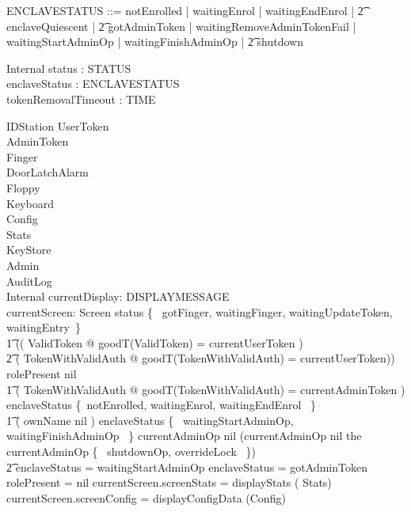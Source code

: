 \begin{zed}
        ENCLAVESTATUS ::= notEnrolled | waitingEnrol | waitingEndEnrol |
\also \t2          enclaveQuiescent |
\also \t2          gotAdminToken | waitingRemoveAdminTokenFail |
waitingStartAdminOp | waitingFinishAdminOp |
\also \t2          shutdown 
\end{zed}

\begin{schema}{Internal}
        status : STATUS
\\      enclaveStatus : ENCLAVESTATUS
\\      tokenRemovalTimeout : TIME
\end{schema}

\begin{schema}{IDStation}
	UserToken
\\	AdminToken
\\	Finger
\\	DoorLatchAlarm
\\      Floppy
\\      Keyboard
\\      Config
\\      Stats
\\      KeyStore
\\      Admin
\\      AuditLog
\\      Internal
\also
	currentDisplay: DISPLAYMESSAGE
\\      currentScreen: Screen
\where
	status \in \{~ gotFinger, waitingFinger, waitingUpdateToken, waitingEntry~\} \implies
\\ \t1		 (( \exists ValidToken @ 
			goodT(\theta ValidToken) = currentUserToken )
\\ \t2  \lor ( \exists TokenWithValidAuth @ 
			goodT(\theta TokenWithValidAuth) = currentUserToken))
\also
        rolePresent \neq nil \implies       
\\ \t1		 ( \exists TokenWithValidAuth @ 
			goodT(\theta TokenWithValidAuth) = currentAdminToken )
\also
        enclaveStatus \notin \{~notEnrolled, waitingEnrol, waitingEndEnrol ~\} \implies       
\\ \t1          ( ownName \neq nil )
\also
        enclaveStatus \in \{~ waitingStartAdminOp, waitingFinishAdminOp ~\} \iff currentAdminOp \neq nil
\also
       (currentAdminOp \neq nil \land the~ currentAdminOp \in \{~
shutdownOp, overrideLock ~\}) 
\\ \t2          \implies enclaveStatus = waitingStartAdminOp
\also
        enclaveStatus = gotAdminToken \implies rolePresent = nil
\also   %
        currentScreen.screenStats = displayStats (\theta
        Stats)
\\      currentScreen.screenConfig = displayConfigData (\theta Config)
\end{schema}

